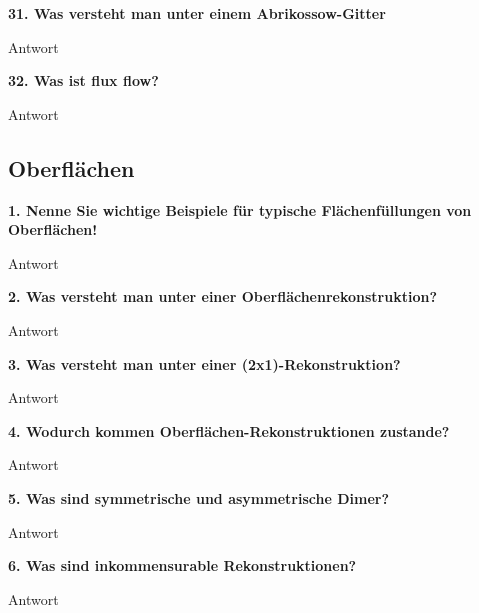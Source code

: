 \noindent\textbf{31. Was versteht man unter einem Abrikossow-Gitter}\\
\begin{addmargin}[25pt]{0pt}
Antwort\\
\end{addmargin}

\noindent\textbf{32. Was ist flux flow?}\\
\begin{addmargin}[25pt]{0pt}
Antwort\\
\end{addmargin}

\subsection{Oberflächen}
\noindent\textbf{1. Nenne Sie wichtige Beispiele für typische Flächenfüllungen von Oberflächen!}\\
\begin{addmargin}[25pt]{0pt}
Antwort\\
\end{addmargin}

\noindent\textbf{2. Was versteht man unter einer Oberflächenrekonstruktion?}\\
\begin{addmargin}[25pt]{0pt}
Antwort\\
\end{addmargin}

\noindent\textbf{3. Was versteht man unter einer (2x1)-Rekonstruktion?}\\
\begin{addmargin}[25pt]{0pt}
Antwort\\
\end{addmargin}

\noindent\textbf{4. Wodurch kommen Oberflächen-Rekonstruktionen zustande?}\\
\begin{addmargin}[25pt]{0pt}
Antwort\\
\end{addmargin}

\noindent\textbf{5. Was sind symmetrische und asymmetrische Dimer?}\\
\begin{addmargin}[25pt]{0pt}
Antwort\\
\end{addmargin}

\noindent\textbf{6. Was sind inkommensurable Rekonstruktionen?}\\
\begin{addmargin}[25pt]{0pt}
Antwort\\
\end{addmargin}

